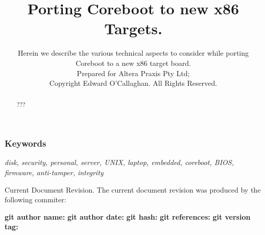 %
%
%


\title{
  \Huge
  Porting Coreboot to new x86 Targets.
 }
 \author{
   \Large
   Herein we describe the various technical aspects to consider while porting
   Coreboot to a new x86 target board.
   \\
   \vspace{3ex}
   \small
   Prepared for Altera Praxis Pty Ltd;
   \\
   \vspace{1ex}
   Copyright  Edward O'Callaghan. All Rights Reserved.
}
\date{} %
\thispagestyle{empty}
\maketitle

\begin{abstract}

  ???

\end{abstract}

\subsubsection*{Keywords}
\textit{disk, security, personal, server, UNIX, laptop, embedded, coreboot,
  BIOS, firmware, anti-tamper, integrity}

\thispagestyle{empty}
\newpage
\tableofcontents

\newpage
\thispagestyle{empty}

\begin{center}
  \huge{Current Document Revision.}
  \newline\newline\newline\newline
  \normalsize
  The current document revision was produced by the following commiter:
\end{center}

\begin{framed}
  \indent
  \textbf{git author name:} \gitAuthorName
  \newline\indent
  \textbf{git author date:} \gitAuthorIsoDate
  \newline\indent
  \textbf{git hash:} \gitAbbrevHash{}
  \newline\indent
  \textbf{git references:} \gitReferences
  \newline\indent
  \textbf{git version tag:} \gitVtag
\end{framed}
%
\newpage
